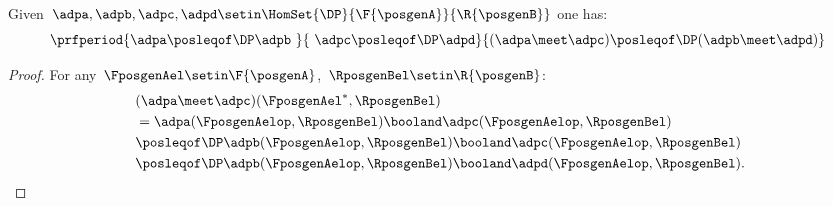 \begin{lemma}
    \label{lem:intersection_mon}
    Given~$\adpa,\adpb,\adpc,\adpd \setin \HomSet{\DP}{\F{\posgenA}}{\R{\posgenB}}$ one has:
    \begin{equation*}
        \prfperiod{\adpa\posleqof\DP \adpb\ }{\ \adpc\posleqof\DP \adpd}{(\adpa\meet \adpc)\posleqof\DP (\adpb\meet \adpd)}
    \end{equation*}
\end{lemma}
\begin{proof}
    For any~$\FposgenAel\setin \F{\posgenA}$,~$\RposgenBel\setin \R{\posgenB}$:
    \begin{equation*}
        \begin{aligned}
            ~ & (\adpa \meet \adpc)(\FposgenAel^*,\RposgenBel) \\
              & =\adpa(\FposgenAelop,\RposgenBel)\booland \adpc(\FposgenAelop,\RposgenBel) \\
              & \posleqof\DP \adpb(\FposgenAelop,\RposgenBel)\booland \adpc(\FposgenAelop,\RposgenBel) \\
              & \posleqof\DP \adpb(\FposgenAelop,\RposgenBel)\booland \adpd(\FposgenAelop,\RposgenBel).
        \end{aligned}
    \end{equation*}
\end{proof}
